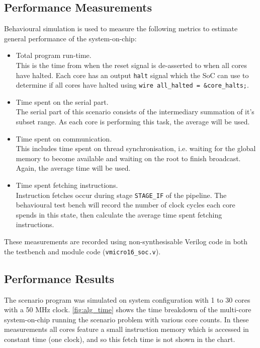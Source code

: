 \subsection{Performance Measurements}
Behavioural simulation is used to measure the following metrics to estimate general performance of the system-on-chip:
\begin{itemize}
\item Total program run-time.\\This is the time from when the reset signal is de-asserted to when all cores have halted. Each core has an output \verb|halt| signal which the SoC can use to determine if all cores have halted using \verb|wire all_halted = &core_halts;|. 

\item Time spent on the serial part.\\The serial part of this scenario consists of the intermediary summation of it's subset range. As each core is performing this task, the average will be used.

\item Time spent on communication.\\This includes time spent on thread synchronisation, i.e. waiting for the global memory to become available and waiting on the root to finish broadcast. Again, the average time will be used.

\item Time spent fetching instructions.\\Instruction fetches occur during stage \verb|STAGE_IF| of the pipeline. The behavioural test bench will record the number of clock cycles each core spends in this state, then calculate the average time spent fetching instructions. 
\end{itemize}

These measurements are recorded using non-synthesisable Verilog code in both the testbench and module code (\verb|vmicro16_soc.v|).

\subsection{Performance Results}
\label{sec:result_results}
The scenario program was simulated on system configuration with 1 to 30 cores with a 50 MHz clock.
\cref{fig:alg_time} shows the time breakdown of the multi-core system-on-chip running the scenario problem with various core counts. In these measurements all cores feature a small instruction memory which is accessed in constant time (one clock), and so this fetch time is not shown in the chart. 

